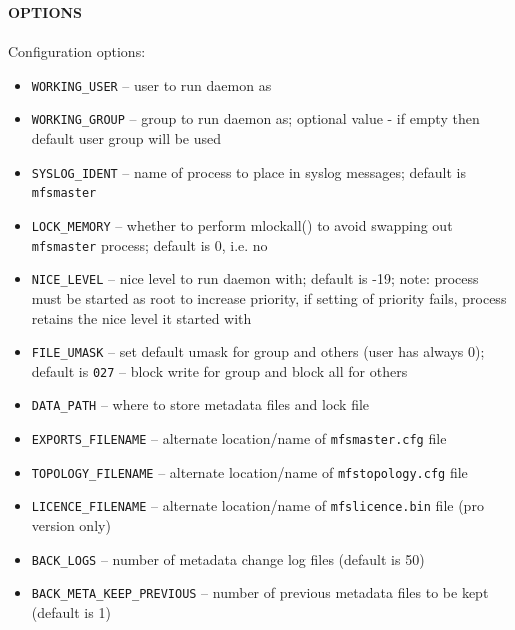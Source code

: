 \documentclass[a4paper,11pt,english]{report}
\def\code#1{\texttt{#1}}
\begin{document}
				\bigskip
				\textbf{OPTIONS} \\\\
				Configuration options:
				\begin{itemize}
					\item \code{WORKING\_USER}
						-- user to run daemon as

					\item \code{WORKING\_GROUP}
						-- group to run daemon as; optional value - if empty  then  default
						user group will be used

					\item \code{SYSLOG\_IDENT}
						-- name  of process to place in syslog messages; default is \code{mfsmaster}

					\item \code{LOCK\_MEMORY}
						-- whether to perform mlockall() to avoid  swapping  out  \code{mfsmaster}
						process; default is 0, i.e. no

					\item \code{NICE\_LEVEL}
						-- nice  level  to  run  daemon with; default is -19; note: process
						must be started as root to increase priority, if setting of
						priority fails, process retains the nice level it started with

					\item \code{FILE\_UMASK}
						-- set  default  umask  for  group  and others (user has always 0);
						default is \code{027} -- block write for group and block all for others

					\item \code{DATA\_PATH}
						-- where to store metadata files and lock file

					\item \code{EXPORTS\_FILENAME}
						-- alternate location/name of \code{mfsmaster.cfg} file

					\item \code{TOPOLOGY\_FILENAME}
						-- alternate location/name of \code{mfstopology.cfg} file
						
					\item \code{LICENCE\_FILENAME}
						-- alternate location/name of \code{mfslicence.bin} file (pro version only)

					\item \code{BACK\_LOGS}
						-- number of metadata change log files (default is 50)

					\item \code{BACK\_META\_KEEP\_PREVIOUS}
						-- number of previous metadata files to be kept (default is 1)


\end{itemize}
\end{document}

